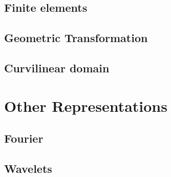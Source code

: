\begin{frame}{}
  
\end{frame}

\subsection{Finite elements}
\label{sec:finite-elements}

\begin{frame}{}
  
\end{frame}

\subsection{Geometric Transformation}
\label{sec:geom-transf}

\begin{frame}{}
  
\end{frame}

\subsection{Curvilinear domain}
\label{sec:curvilinear-domain}

\begin{frame}{}
  
\end{frame}


\section{Other Representations}
\label{sec:other-repr}

\subsection{Fourier}
\label{sec:fourier-polynomials}

\begin{frame}{}
  
\end{frame}


\subsection{Wavelets}
\label{sec:wavelets}

\begin{frame}{}
  
\end{frame}

